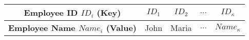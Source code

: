 
\begin{tabular}{c || cccc}
	\textbf{Employee ID \(ID_i\) (Key)} & \(ID_1\) & \(ID_2\) & \(\dots\) & \(ID_{\kappa}\) \\
	\hline
	\textbf{Employee Name \(Name_i\) (Value)} & John & Maria & \(\dots\) & \(Name_{\kappa}\) \\
\end{tabular}
